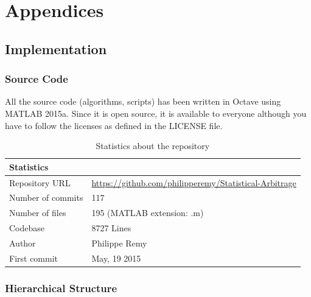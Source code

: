 \documentclass[11pt,a4,twosided,singlespacing,titlepagenumber=on]{scrreprt}
\numberwithin{equation}{chapter} %
\theoremstyle{remark}
\begin{document}
\chapter{Appendices}

\section{Implementation}

\subsection{Source Code}
\label{app:implementation}
All the source code (algorithms, scripts) has been written in Octave using MATLAB 2015a. Since it is open source, it is available to everyone although you have to follow the licenses as defined in the LICENSE file.

\begin{table}[H]
\centering
\begin{tabular}{ll}
\hline
\multicolumn{1}{|l}{Statistics}     & \multicolumn{1}{l|}{} \\ \hline
Repository URL 					   &  \url{https://github.com/philipperemy/Statistical-Arbitrage} \\
Number of commits   			 &  117 \\
Number of files   				 &  195 (MATLAB extension: .m) \\
Codebase   				         &  8727 Lines\\
Author          &  Philippe Remy \\
First commit & May, 19 2015 \\
\hline
\end{tabular}
\caption{Statistics about the repository}
\label{Statistics_repository}
\end{table}

\subsection{Hierarchical Structure}
\end{document}
